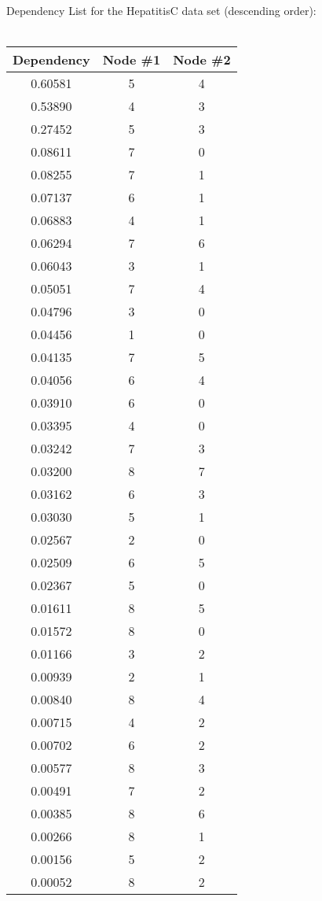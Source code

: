 \documentclass[11pt,a4paper,oneside]{report}
\begin{document}
\begin{table}[H]
  \centering
  Dependency List for the HepatitisC data set (descending order):\\
  \ \\
  \begin{tabular}{| c | c | c |}
    \hline
    Dependency & Node \#1 & Node \#2\\
    \hline
    0.60581 & 5 & 4 \\
    \hline
    0.53890 & 4 & 3 \\
    \hline
    0.27452 & 5 & 3 \\
    \hline
    0.08611 & 7 & 0 \\
    \hline
    0.08255 & 7 & 1 \\
    \hline
    0.07137 & 6 & 1 \\
    \hline
    0.06883 & 4 & 1 \\
    \hline
    0.06294 & 7 & 6 \\
    \hline
    0.06043 & 3 & 1 \\
    \hline
    0.05051 & 7 & 4 \\
    \hline
    0.04796 & 3 & 0 \\
    \hline
    0.04456 & 1 & 0 \\
    \hline
    0.04135 & 7 & 5 \\
    \hline
    0.04056 & 6 & 4 \\
    \hline
    0.03910 & 6 & 0 \\
    \hline
    0.03395 & 4 & 0 \\
    \hline
    0.03242 & 7 & 3 \\
    \hline
    0.03200 & 8 & 7 \\
    \hline
    0.03162 & 6 & 3 \\
    \hline
    0.03030 & 5 & 1 \\
    \hline
    0.02567 & 2 & 0 \\
    \hline
    0.02509 & 6 & 5 \\
    \hline
    0.02367 & 5 & 0 \\
    \hline
    0.01611 & 8 & 5 \\
    \hline
    0.01572 & 8 & 0 \\
    \hline
    0.01166 & 3 & 2 \\
    \hline
    0.00939 & 2 & 1 \\
    \hline
    0.00840 & 8 & 4 \\
    \hline
    0.00715 & 4 & 2 \\
    \hline
    0.00702 & 6 & 2 \\
    \hline
    0.00577 & 8 & 3 \\
    \hline
    0.00491 & 7 & 2 \\
    \hline
    0.00385 & 8 & 6 \\
    \hline
    0.00266 & 8 & 1 \\
    \hline
    0.00156 & 5 & 2 \\
    \hline
    0.00052 & 8 & 2 \\
    \hline
  \end{tabular}
\end{table}
\end{document}
